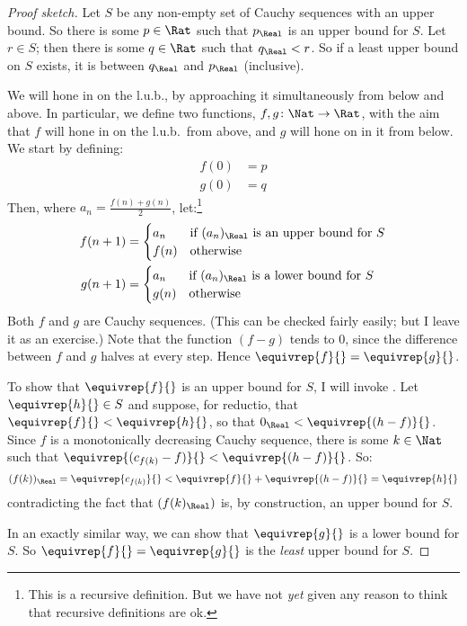 \documentclass[../../../include/open-logic-section]{subfiles}
\begin{document}
\begin{proof}[Proof sketch]
Let $S$ be any non-empty set of Cauchy sequences with an upper bound. So there is some $p \in \Rat$ such that $p_{\Real}$ is an upper bound for $S$. Let $r \in S$; then there is some $q \in \Rat$ such that $q_{\Real} < r$. So if a least upper bound on $S$ exists, it is between $q_\Real$ and $p_\Real$ (inclusive). 

We will hone in on the l.u.b., by approaching it simultaneously from below and above. In particular, we define two functions, $f, g \colon \Nat \to \Rat$, with the aim that $f$ will hone in on the l.u.b.\ from above, and $g$ will hone on in it from below. We start by defining:
\begin{align*}
	f(0) &= p \\
	g(0) &= q
\end{align*}
Then, where $a_n = \frac{f(n) + g(n)}{2}$, let:\footnote{This is a recursive definition. But we have not \emph{yet} given any reason to think that recursive definitions are ok.}
\begin{align*}
	f(n+1) &=
	\begin{cases}
		a_n &\text{if $(a_n)_\Real$ is an upper bound for }S\\
		f(n)&\text{otherwise}
	\end{cases}\\
	g(n+1) &=
	\begin{cases}
		a_n &\text{if $(a_n)_\Real$ is a lower bound for }S\\
	 	g(n) &\text{otherwise}
	\end{cases}
\end{align*}
Both $f$ and $g$ are Cauchy sequences. (This can be checked fairly easily; but I leave it as an exercise.) Note that the function $(f-g)$ tends to $0$, since the difference between $f$ and $g$ halves at every step. Hence $\equivrep{f}{} = \equivrep{g}{}$. 

To show that  $\equivrep{f}{}$ is an upper bound for $S$, I will invoke . Let $\equivrep{h}{} \in S$ and suppose, for reductio, that $\equivrep{f}{} < \equivrep{h}{}$, so that $0_\Real < \equivrep{(h-f)}{}$. Since $f$ is a monotonically decreasing Cauchy sequence, there is some $k \in \Nat$ such that $\equivrep{(c_{f(k)} - f)}{} < \equivrep{(h-f)}{}$. So:
$$(f(k))_\Real  = \equivrep{c_{f(k)}}{} < \equivrep{f}{} + \equivrep{(h-f)}{} = \equivrep{h}{}$$
contradicting the fact that $(f(k)_\Real)$ is, by construction, an upper bound for $S$.

In an exactly similar way, we can show that $\equivrep{g}{}$ is a lower bound for $S$. So $\equivrep{f}{} = \equivrep{g}{}$ is the \emph{least} upper bound for $S$.
\end{proof}
\end{document}
